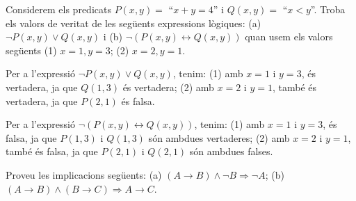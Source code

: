 \begin{exercici}
Considerem els predicats $P(x,y)=$ \enquote{$x+y=4$} i $Q(x,y)=$ \enquote{$x<y$}. Troba els
valors de veritat de les següents expressions lògiques: (a) $\lnot
P(x,y)\vee Q(x,y)$ i (b) $\lnot(P(x,y)\longleftrightarrow Q(x,y))$ quan usem
els valors següents (1) $x=1,y=3$; (2) $x=2,y=1$.
\end{exercici}

\begin{solucio}
Per a l'expressió $\lnot P(x,y)\vee Q(x,y)$, tenim:
(1) amb $x=1$ i $y=3$, és vertadera, ja que $Q(1,3)$ és vertadera;
(2) amb $x=2$ i $y=1$, també és vertadera, ja que $P(2,1)$ és falsa.

Per a l'expressió $\lnot(P(x,y)\longleftrightarrow Q(x,y))$, tenim:
(1) amb $x=1$ i $y=3$, és falsa, ja que $P(1,3)$ i $Q(1,3)$ són
ambdues vertaderes; (2) amb $x=2$ i $y=1$, també és falsa, ja que
$P(2,1)$ i $Q(2,1)$ són ambdues falses.
\end{solucio}

\begin{exercici}
Proveu les implicacions següents: (a) $(A\longrightarrow B)\wedge\lnot
B\Longrightarrow\lnot A$; (b) $\left(  A\longrightarrow B\right)
\wedge\left(  B\longrightarrow C\right)  \Longrightarrow A\longrightarrow C$.
\end{exercici}

